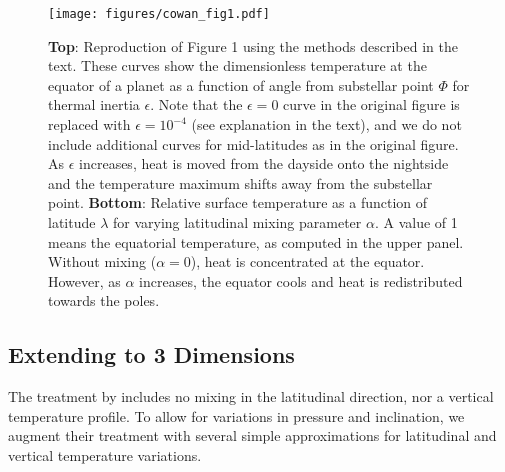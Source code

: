 \documentclass[twocolumn,linenumbers]{aastex631}
\begin{document}
\begin{figure}
    \centering
    \texttt{[image: figures/cowan\_fig1.pdf]}
    \caption{
        {\bf Top}: Reproduction of \citet{cowan2011} Figure 1 using the methods described in the text. These curves show the dimensionless temperature at the equator of a planet as a function of angle from substellar point $\Phi$ for thermal inertia $\epsilon$. Note that the $\epsilon=0$ curve in the original figure is replaced with $\epsilon=10^{-4}$ (see explanation in the text), and we do not include additional curves for mid-latitudes as in the original figure. As $\epsilon$ increases, heat is moved from the dayside onto the nightside and the temperature maximum shifts away from the substellar point.
        {\bf Bottom}: Relative surface temperature as a function of latitude $\lambda$ for varying latitudinal mixing parameter $\alpha$. A value of 1 means the equatorial temperature, as computed in the upper panel. Without mixing ($\alpha=0$), heat is concentrated at the equator. However, as $\alpha$ increases, the equator cools and heat is redistributed towards the poles.
    }
    \label{fig:cowan_curves}
\end{figure}

\subsection{Extending to 3 Dimensions}

The treatment by \citet{cowan2011} includes no mixing in the latitudinal direction, nor a vertical temperature profile. To allow for variations in pressure and inclination, we augment their treatment with several simple approximations for latitudinal and vertical temperature variations. 
\end{document}
